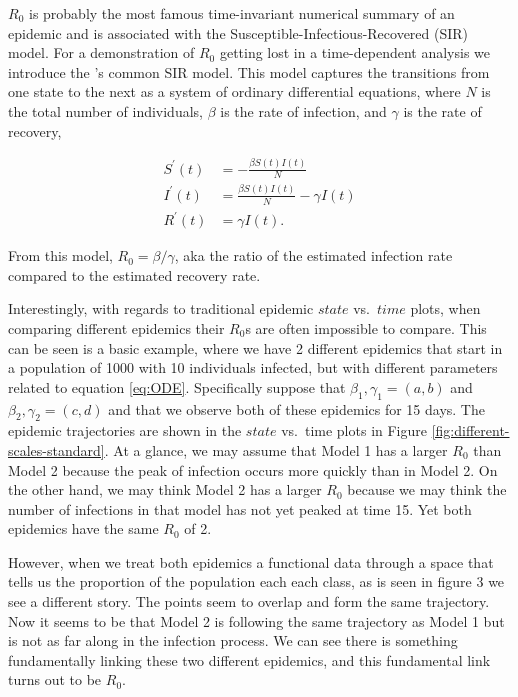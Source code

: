 \documentclass[
  shortnames]{jss}
\begin{document}
\(R_0\) is probably the most famous time-invariant numerical summary of
an epidemic and is associated with the Susceptible-Infectious-Recovered
(SIR) model. For a demonstration of \(R_0\) getting lost in a
time-dependent analysis we introduce the \citet{Kermack1927}'s common
SIR model. This model captures the transitions from one state to the
next as a system of ordinary differential equations, where \(N\) is the
total number of individuals, \(\beta\) is the rate of infection, and
\(\gamma\) is the rate of recovery,

\begin{align}\label{eq:sir-ode}
    S^\prime(t) &= -\frac{\beta S(t)I(t)}{N} \\
    I^\prime(t) &= \frac{\beta S(t)I(t)}{N} - \gamma I(t) \nonumber\\
    R^\prime(t) &= \gamma I(t) \nonumber.
\end{align}

From this model, \(R_0 = \beta/\gamma\), aka the ratio of the estimated
infection rate compared to the estimated recovery rate.

Interestingly, with regards to traditional epidemic \(state\)
vs.~\(time\) plots, when comparing different epidemics their \(R_0\)s
are often impossible to compare. This can be seen is a basic example,
where we have 2 different epidemics that start in a population of 1000
with 10 individuals infected, but with different parameters related to
equation \ref{eq:ODE}. Specifically suppose that
\(\beta_1, \gamma_1 = (a,b)\) and \(\beta_2, \gamma_2 = (c,d)\) and that
we observe both of these epidemics for 15 days. The epidemic
trajectories are shown in the \(state\) vs.~time plots in Figure
\ref{fig:different-scales-standard}. At a glance, we may assume that
Model 1 has a larger \(R_0\) than Model 2 because the peak of infection
occurs more quickly than in Model 2. On the other hand, we may think
Model 2 has a larger \(R_0\) because we may think the number of
infections in that model has not yet peaked at time 15. Yet both
epidemics have the same \(R_0\) of 2.

However, when we treat both epidemics a functional data through a space
that tells us the proportion of the population each each class, as is
seen in figure 3 we see a different story. The points seem to overlap
and form the same trajectory. Now it seems to be that Model 2 is
following the same trajectory as Model 1 but is not as far along in the
infection process. We can see there is something fundamentally linking
these two different epidemics, and this fundamental link turns out to be
\(R_0\).
\end{document}
